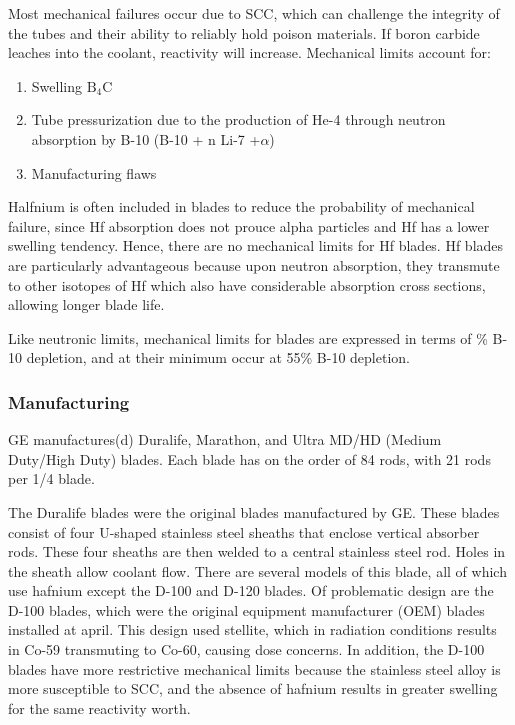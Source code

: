 \documentclass[10pt]{article}
\newcounter{subsubsubsection}[subsubsection]
\begin{document}
Most mechanical failures occur due to SCC, which can challenge the integrity of the tubes and their ability to reliably hold poison materials. If boron carbide leaches into the coolant, reactivity will increase. Mechanical limits account for:

\begin{enumerate}
\item Swelling \(\textrm{B}_4\)C
\item Tube pressurization due to the production of He-4 through neutron absorption by B-10 (B-10 + n  Li-7 +\(\alpha\))
\item Manufacturing flaws
\end{enumerate}

Halfnium is often included in blades to reduce the probability of mechanical failure, since Hf absorption does not prouce alpha particles and Hf has a lower swelling tendency. Hence, there are no mechanical limits for Hf blades. Hf blades are particularly advantageous because upon neutron absorption, they transmute to other isotopes of Hf which also have considerable absorption cross sections, allowing longer blade life. 

Like neutronic limits, mechanical limits for blades are expressed in terms of \% B-10 depletion, and at their minimum occur at 55\% B-10 depletion. 

\subsubsection{Manufacturing}

GE manufactures(d) Duralife, Marathon, and Ultra MD/HD (Medium Duty/High Duty) blades. Each blade has on the order of 84 rods, with 21 rods per 1/4 blade. 

The Duralife blades were the original blades manufactured by GE. These blades consist of four U-shaped stainless steel sheaths that enclose vertical absorber rods. These four sheaths are then welded to a central stainless steel rod. Holes in the sheath allow coolant flow. There are several models of this blade, all of which use hafnium except the D-100 and D-120 blades. Of problematic design are the D-100 blades, which were the original equipment manufacturer (OEM) blades installed at april. This design used stellite, which in radiation conditions results in Co-59 transmuting to Co-60, causing dose concerns. In addition, the D-100 blades have more restrictive mechanical limits because the stainless steel alloy is more susceptible to SCC, and the absence of hafnium results in greater swelling for the same reactivity worth. 
\end{document}
